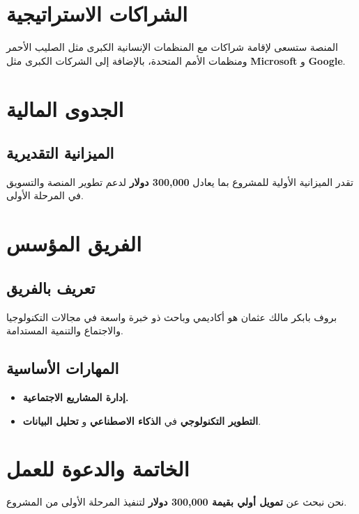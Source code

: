 \documentclass[12pt]{article}
\begin{document}
\section{\textcolor{sectionColor}{الشراكات الاستراتيجية}}
المنصة ستسعى لإقامة شراكات مع المنظمات الإنسانية الكبرى مثل الصليب الأحمر ومنظمات الأمم المتحدة، بالإضافة إلى الشركات الكبرى مثل \textbf{Microsoft} و \textbf{Google}.

\section{\textcolor{sectionColor}{الجدوى المالية}}

\subsection*{\textcolor{sectionColor}{الميزانية التقديرية}}
تقدر الميزانية الأولية للمشروع بما يعادل \textbf{300,000 دولار} لدعم تطوير المنصة والتسويق في المرحلة الأولى.

\section{\textcolor{sectionColor}{الفريق المؤسس}}

\subsection*{\textcolor{sectionColor}{تعريف بالفريق}}
بروف بابكر مالك عثمان هو أكاديمي وباحث ذو خبرة واسعة في مجالات التكنولوجيا والاجتماع والتنمية المستدامة.

\subsection*{\textcolor{sectionColor}{المهارات الأساسية}}
\begin{itemize}
    \item \textbf{إدارة المشاريع الاجتماعية.}
    \item \textbf{التطوير التكنولوجي} في \textbf{الذكاء الاصطناعي} و \textbf{تحليل البيانات}.
\end{itemize}

\section{\textcolor{sectionColor}{الخاتمة والدعوة للعمل}}
نحن نبحث عن \textbf{تمويل أولي بقيمة 300,000 دولار} لتنفيذ المرحلة الأولى من المشروع.
\end{document}
